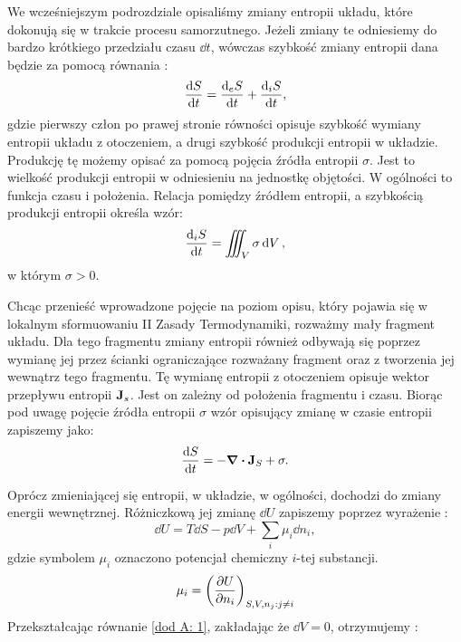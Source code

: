 \documentclass[10pt, a4paper, twoside, onecolumn]{article}
\numberwithin{equation}{section}
\begin{document}
	We wcześniejszym podrozdziale opisaliśmy zmiany entropii układu, które dokonują się w trakcie procesu samorzutnego. Jeżeli zmiany te odniesiemy do bardzo krótkiego przedziału czasu \(\dd{t}\), wówczas szybkość zmiany entropii dana będzie za pomocą równania \cite{mazur, prigogine}:
	\begin{equation}
		\dv{S}{t} = \dv{_{e}S}{t} + \dv{_{i}S}{t},
	\end{equation}
	gdzie pierwszy człon po prawej stronie równości opisuje szybkość wymiany entropii układu z otoczeniem, a drugi szybkość produkcji entropii w układzie. Produkcję tę możemy opisać za pomocą pojęcia źródła entropii \(\sigma\). Jest to wielkość produkcji entropii w odniesieniu na jednostkę objętości. W ogólności to funkcja czasu i położenia. Relacja pomiędzy źródłem entropii, a szybkością produkcji entropii określa wzór:
	\begin{equation}
		\dv{_{i}S}{t} = \iiint_{V}\sigma\dd{V},
	\end{equation}
	w którym \(\sigma>0\). \par
	Chcąc przenieść wprowadzone pojęcie na poziom opisu, który pojawia się w lokalnym sformuowaniu II Zasady Termodynamiki, rozważmy mały fragment układu. Dla tego fragmentu zmiany entropii również odbywają się poprzez wymianę jej przez ścianki ograniczające rozważany fragment oraz z tworzenia jej wewnątrz tego fragmentu. Tę wymianę entropii z otoczeniem opisuje wektor przepływu entropii \(\vb{J}_{s}\). Jest on zależny od położenia fragmentu i czasu. Biorąc pod uwagę pojęcie źródła entropii \(\sigma\) wzór opisujący zmianę w czasie entropii zapiszemy jako:
	\begin{equation} \label{dod A: 5}
		\dv{S}{t} = -\div{\vb{J}_{S}} + \sigma.
	\end{equation}\par
	Oprócz zmieniającej się entropii, w układzie, w ogólności, dochodzi do zmiany energii wewnętrznej. Różniczkową jej zmianę $\dd{U}$ zapiszemy poprzez wyrażenie \cite{prigogine_modern, landau}:
	\begin{equation}
		\dd{U}=T\dd{S}-p\dd{V}+\sum_{i}\mu_{i}\dd{n_{i}}, \label{dod A: 1}
	\end{equation}
	gdzie symbolem $\mu_{i}$ oznaczono potencjał chemiczny $i$-tej substancji. 
	\begin{equation}
		\mu_{i}=\left(\pdv{U}{n_{i}}\right)_{S, V, n_{j}: j\neq i}
	\end{equation}
	Przekształcając równanie \eqref{dod A: 1}, zakładając że $\dd{V}=0$, otrzymujemy \cite{pigon1}:
\end{document}
